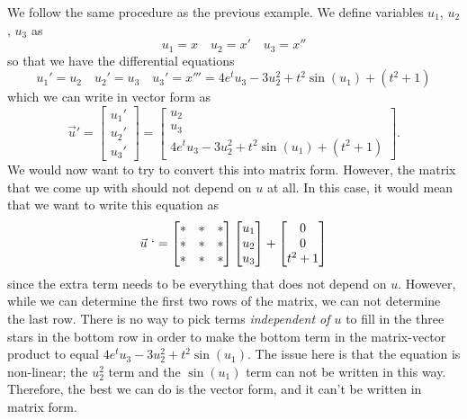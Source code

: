 \documentclass{ximera}
\begin{document}
\begin{exampleSol}
    We follow the same procedure as the previous example. We define variables $u_1$, $u_2$, $u_3$ as 
    \begin{equation*}
        u_1 = x \quad u_2 = x' \quad u_3 = x''
    \end{equation*}
    so that we have the differential equations
    \begin{equation*}
        u_1' = u_2 \quad u_2' = u_3 \quad u_3' = x''' = 4e^tu_3 - 3u_2^2 + t^2\sin(u_1) + (t^2 + 1)
    \end{equation*}
    which we can write in vector form as
    \begin{equation*}
        \vec{u}' = 
        \begin{bmatrix} 
            u_1'\\
            u_2'\\ 
            u_3' 
        \end{bmatrix} = 
        \begin{bmatrix} 
            u_2 \\ 
            u_3 \\  
            4e^tu_3 - 3u_2^2 + t^2\sin(u_1) + (t^2 + 1) 
        \end{bmatrix}.
    \end{equation*}
    We would now want to try to convert this into matrix form. However, the matrix that we come up with should not depend on $u$ at all. In this case, it would mean that we want to write this equation as
    \begin{equation*}
    \vec{u}\ ` = 
    \begin{bmatrix} 
        * & * & * \\ 
        * & * & * \\ 
        * & * & * 
    \end{bmatrix} 
    \begin{bmatrix} 
        u_1 \\ 
        u_2 \\ 
        u_3 
    \end{bmatrix} + 
    \begin{bmatrix} 
        0 \\ 
        0 \\ 
        t^2 + 1 
    \end{bmatrix} 
    \end{equation*}
    since the extra term needs to be everything that does not depend on $u$. However, while we can determine the first two rows of the matrix, we can not determine the last row. There is no way to pick terms \emph{independent of $u$} to fill in the three stars in the bottom row in order to make the bottom term in the matrix-vector product to equal $4e^tu_3 - 3u_2^2 + t^2\sin(u_1)$. The issue here is that the equation is non-linear; the $u_2^2$ term and the $\sin(u_1)$ term can not be written in this way. Therefore, the best we can do is the vector form, and it can't be written in matrix form.
    

\end{exampleSol}
\end{document}
